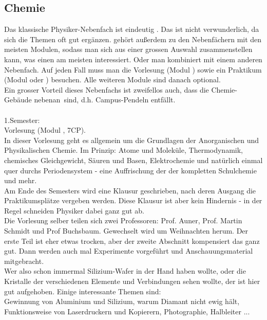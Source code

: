 \subsection{Chemie}

Das klassische Physiker-Nebenfach ist eindeutig . Das ist nicht 
verwunderlich, da sich die Themen oft gut erg\"anzen.  geh\"ort 
außerdem zu den Nebenf\"achern mit den meisten Modulen, sodass man sich aus 
einer grossen Auswahl zusammenstellen kann, was einen am meisten interessiert.
Oder man kombiniert mit einem anderen Nebenfach. Auf jeden Fall muss man die
Vorlesung 
(Modul ) sowie ein Praktikum (Modul  oder ) besuchen. Alle 
weiteren Module sind danach optional.\\
Ein grosser Vorteil dieses Nebenfachs ist zweifellos auch, dass die 
Chemie-Geb\"aude \glqq nebenan\grqq ~sind, d.h. Campus-Pendeln entf\"allt.
\\
\\
1.Semester:\\
Vorlesung 
(Modul , 7CP). \\
In dieser Vorlesung geht es allgemein um die Grundlagen 
der Anorganischen und Physikalischen Chemie. Im Prinzip: Atome und Molek\"ule,
Thermodynamik, chemisches Gleichgewicht, S\"auren und Basen, Elektrochemie 
und nat\"urlich einmal quer durchs Periodensystem - eine Auffrischung der 
der kompletten Schulchemie und mehr.\\
Am Ende des Semesters wird eine Klausur geschrieben, nach deren Ausgang die 
Praktikumspl\"atze vergeben werden. Diese Klausur ist aber kein Hindernis -
in der Regel schneiden Physiker dabei ganz gut ab.\\
Die Vorlesung selber teilen sich zwei Professoren: Prof. Auner,
Prof. Martin Schmidt und Prof Buchsbaum. Gewechselt wird um Weihnachten herum. Der erste Teil 
ist eher etwas trocken, aber der zweite Abschnitt kompensiert das ganz gut.
Dann werden auch mal Experimente vorgef\"uhrt und Anschauungsmaterial
mitgebracht.\\
Wer also schon immermal Silizium-Wafer in der Hand haben wollte, oder die 
Kristalle der verschiedenen Elemente und Verbindungen sehen wollte, der ist 
hier gut aufgehoben. Einige interessante Themen sind: \\
Gewinnung von Aluminium und Silizium, warum Diamant nicht ewig h\"alt, 
Funktionsweise von Laserdruckern und Kopierern, Photographie, Halbleiter ...
